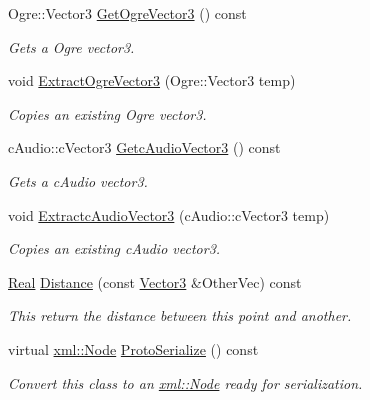 \begin{DoxyCompactItemize}
Ogre::Vector3 \hyperlink{classphys_1_1Vector3_a17265d86a74139398d310b56ba7e89b8}{GetOgreVector3} () const 
\begin{DoxyCompactList}\small\item\em Gets a Ogre vector3. \item\end{DoxyCompactList}\item 
void \hyperlink{classphys_1_1Vector3_a09a31cb8fe491f61e0cc10d21705a0df}{ExtractOgreVector3} (Ogre::Vector3 temp)
\begin{DoxyCompactList}\small\item\em Copies an existing Ogre vector3. \item\end{DoxyCompactList}\item 
cAudio::cVector3 \hyperlink{classphys_1_1Vector3_a58b1ac39dfee4c360c16944a7e7f657d}{GetcAudioVector3} () const 
\begin{DoxyCompactList}\small\item\em Gets a cAudio vector3. \item\end{DoxyCompactList}\item 
void \hyperlink{classphys_1_1Vector3_aa12021e9cdc092c8628ced1c5910c04c}{ExtractcAudioVector3} (cAudio::cVector3 temp)
\begin{DoxyCompactList}\small\item\em Copies an existing cAudio vector3. \item\end{DoxyCompactList}\item 
\hyperlink{namespacephys_af7eb897198d265b8e868f45240230d5f}{Real} \hyperlink{classphys_1_1Vector3_af59a586331fe9497056b7e0f207658a3}{Distance} (const \hyperlink{classphys_1_1Vector3}{Vector3} \&OtherVec) const 
\begin{DoxyCompactList}\small\item\em This return the distance between this point and another. \item\end{DoxyCompactList}\item 
virtual \hyperlink{classphys_1_1xml_1_1Node}{xml::Node} \hyperlink{classphys_1_1Vector3_a612346e732152d4887cffc755e7ac851}{ProtoSerialize} () const 
\begin{DoxyCompactList}\small\item\em Convert this class to an \hyperlink{classphys_1_1xml_1_1Node}{xml::Node} ready for serialization. \item\end{DoxyCompactList}\item 

\end{DoxyCompactItemize}
